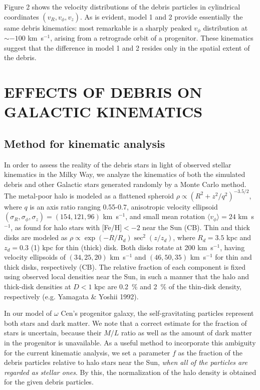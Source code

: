 \documentclass[preprint,12pt]{aastex}
\begin{document}
Figure 2 shows the velocity distributions of the debris particles in
cylindrical coordinates $(v_R,v_\phi,v_z)$.
As is evident, model 1 and 2 provide essentially the same debris kinematics:
most remarkable is a sharply peaked $v_\phi$ distribution at
$\sim -100$ km~s$^{-1}$, arising from a retrograde orbit of a progenitor.
These kinematics suggest that the difference in model 1 and 2 resides only
in the spatial extent of the debris.


\section{EFFECTS OF DEBRIS ON GALACTIC KINEMATICS}

\subsection{Method for kinematic analysis}

In order to assess the reality of the debris stars in light of observed
stellar kinematics in the Milky Way, we analyze the kinematics of
both the simulated debris and other Galactic stars
generated randomly by a Monte Carlo method. The metal-poor halo
is modeled as a flattened spheroid $\rho \propto
(R^2 + z^2/q^2)^{-3.5/2}$, where $q$ is an axis ratio ranging 0.55-0.7,
anisotropic velocity ellipsoid $(\sigma_R,\sigma_\phi,\sigma_z)=(154,121,96)$
km~s$^{-1}$, and small mean rotation $\langle v_\phi \rangle= 24$ km~s$^{-1}$,
as found for halo stars with [Fe/H]$<-2$ near the Sun (CB).
Thin and thick disks are modeled as $\rho \propto
\exp(-R/R_d) \sec^2 (z/z_d)$, where $R_d=3.5$ kpc and $z_d=0.3$ (1)
kpc for thin (thick) disk. Both disks
rotate at 200 km~s$^{-1}$, having velocity ellipsoids of
$(34,25,20)$ km~s$^{-1}$ and $(46,50,35)$ km~s$^{-1}$ for thin and thick
disks, respectively (CB). The relative fraction of each
component is fixed using observed local densities near the Sun,
in such a manner that the halo and thick-disk densities at
$D<1$ kpc are 0.2~\% and 2~\% of the thin-disk density,
respectively (e.g. Yamagata \& Yoshii 1992).

In our model of $\omega$ Cen's progenitor galaxy, the self-gravitating
particles represent both stars and dark matter. We note that a correct estimate
for the fraction of stars is uncertain, because their $M/L$ ratio as well as
the amount of dark matter in the progenitor is unavailable. As a useful method
to incorporate this ambiguity for the current kinematic analysis, we set a
parameter $f$ as the fraction of the debris particles relative to halo stars
near the Sun, {\it when all of the particles are regarded as stellar ones}.
By this, the normalization of the halo density is obtained for the given debris
particles.
\end{document}
